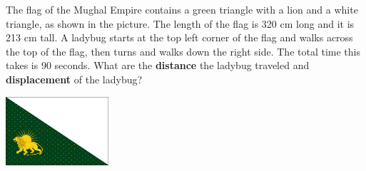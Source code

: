 \documentclass[12pt]{examdesign}
\begin{document}
\begin{shortanswer}[title={Free Response},
	rearrange=no]


\begin{question}
The flag of the Mughal Empire contains a green triangle with a lion and a white triangle, as shown in the picture. The length of the flag is 320 cm long and  it is 213 cm tall.  A ladybug starts at the top left corner of the flag and walks across the top of the flag, then turns and walks down the right side.  The total time this takes is 90 seconds.  What are the \textbf{distance} the ladybug traveled and \textbf{displacement} of the ladybug?
\begin{center} \includegraphics[height=1in]{flag.png} \end{center}


	
	
	\vspace{1in}
	
	
	
\end{question}


	\end{shortanswer}
\end{document}

